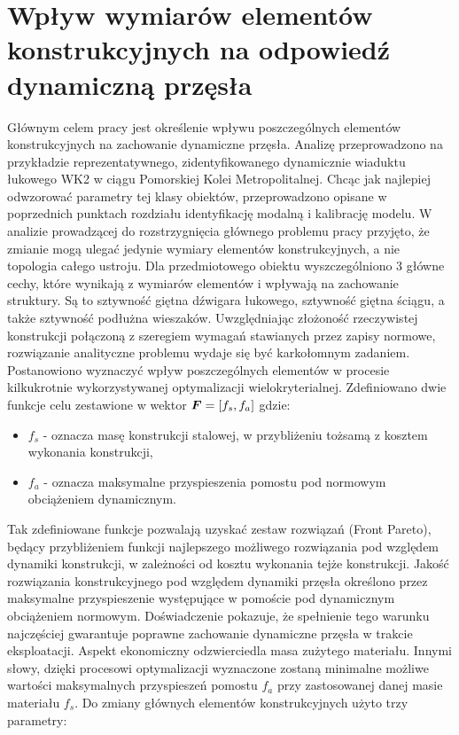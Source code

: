 \section{Wpływ wymiarów elementów konstrukcyjnych na odpowiedź dynamiczną przęsła}
Głównym celem pracy jest określenie wpływu poszczególnych elementów konstrukcyjnych na zachowanie dynamiczne przęsła. Analizę przeprowadzono na przykładzie reprezentatywnego, zidentyfikowanego dynamicznie wiaduktu łukowego WK2 w ciągu Pomorskiej Kolei Metropolitalnej. Chcąc jak najlepiej odwzorować parametry tej klasy obiektów, przeprowadzono opisane w poprzednich punktach rozdziału identyfikację modalną i kalibrację modelu. W analizie prowadzącej do rozstrzygnięcia głównego problemu pracy przyjęto, że zmianie mogą ulegać jedynie wymiary elementów konstrukcyjnych, a nie topologia całego ustroju. Dla przedmiotowego obiektu wyszczególniono 3 główne cechy, które wynikają z wymiarów elementów i wpływają na zachowanie struktury. Są to sztywność giętna dźwigara łukowego, sztywność giętna ściągu, a także sztywność podłużna wieszaków. Uwzględniając złożoność rzeczywistej konstrukcji połączoną z szeregiem wymagań stawianych przez zapisy normowe, rozwiązanie analityczne problemu wydaje się być karkołomnym zadaniem. Postanowiono wyznaczyć wpływ poszczególnych elementów w procesie kilkukrotnie wykorzystywanej optymalizacji wielokryterialnej. Zdefiniowano dwie funkcje celu zestawione w wektor $\bm{F}=[f_s,f_a]$ gdzie:
\begin{itemize}
	\item $f_s$ - oznacza masę konstrukcji stalowej, w przybliżeniu tożsamą z kosztem wykonania konstrukcji,
	\item $f_a$ - oznacza maksymalne przyspieszenia pomostu pod normowym obciążeniem dynamicznym.
\end{itemize}
Tak zdefiniowane funkcje pozwalają uzyskać zestaw rozwiązań (Front Pareto), będący przybliżeniem funkcji najlepszego możliwego rozwiązania pod względem dynamiki konstrukcji, w zależności od kosztu wykonania tejże konstrukcji. Jakość rozwiązania konstrukcyjnego pod względem dynamiki przęsła określono przez maksymalne przyspieszenie występujące w pomoście pod dynamicznym obciążeniem normowym. Doświadczenie pokazuje, że spełnienie tego warunku najczęściej gwarantuje poprawne zachowanie dynamiczne przęsła w trakcie eksploatacji. Aspekt ekonomiczny odzwierciedla masa zużytego materiału. Innymi słowy, dzięki procesowi optymalizacji wyznaczone zostaną minimalne możliwe wartości maksymalnych przyspieszeń pomostu $f_a$ przy zastosowanej danej masie materiału $f_s$. Do zmiany głównych elementów konstrukcyjnych użyto trzy parametry:
